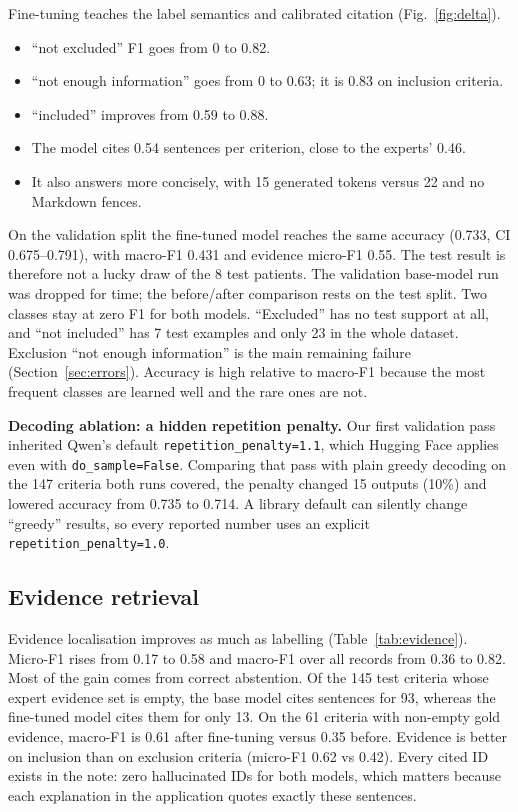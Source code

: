 Fine-tuning teaches the label semantics and calibrated citation (Fig.~\ref{fig:delta}).
\begin{itemize}
\item ``not excluded'' F1 goes from 0 to 0.82.
\item ``not enough information'' goes from 0 to 0.63; it is 0.83 on inclusion criteria.
\item ``included'' improves from 0.59 to 0.88.
\item The model cites 0.54 sentences per criterion, close to the experts' 0.46.
\item It also answers more concisely, with 15 generated tokens versus 22 and no Markdown fences.
\end{itemize}
On the validation split the fine-tuned model reaches the same accuracy (0.733, CI 0.675--0.791), with macro-F1 0.431 and evidence micro-F1 0.55. The test result is therefore not a lucky draw of the 8 test patients. The validation base-model run was dropped for time; the before/after comparison rests on the test split. Two classes stay at zero F1 for both models. ``Excluded'' has no test support at all, and ``not included'' has 7 test examples and only 23 in the whole dataset. Exclusion ``not enough information'' is the main remaining failure (Section~\ref{sec:errors}). Accuracy is high relative to macro-F1 because the most frequent classes are learned well and the rare ones are not.

\textbf{Decoding ablation: a hidden repetition penalty.} Our first validation pass inherited Qwen's default \texttt{repetition\_penalty=1.1}, which Hugging Face applies even with \texttt{do\_sample=False}. Comparing that pass with plain greedy decoding on the 147 criteria both runs covered, the penalty changed 15 outputs (10\%) and lowered accuracy from 0.735 to 0.714. A library default can silently change ``greedy'' results, so every reported number uses an explicit \texttt{repetition\_penalty=1.0}.

\subsection{Evidence retrieval}
Evidence localisation improves as much as labelling (Table~\ref{tab:evidence}). Micro-F1 rises from 0.17 to 0.58 and macro-F1 over all records from 0.36 to 0.82. Most of the gain comes from correct abstention. Of the 145 test criteria whose expert evidence set is empty, the base model cites sentences for 93, whereas the fine-tuned model cites them for only 13. On the 61 criteria with non-empty gold evidence, macro-F1 is 0.61 after fine-tuning versus 0.35 before. Evidence is better on inclusion than on exclusion criteria (micro-F1 0.62 vs 0.42). Every cited ID exists in the note: zero hallucinated IDs for both models, which matters because each explanation in the application quotes exactly these sentences.

